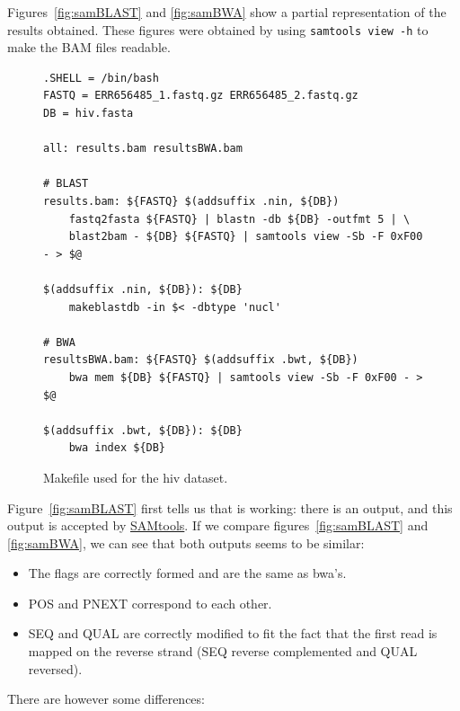 Figures~\ref{fig:samBLAST} and \ref{fig:samBWA} show a partial representation of the results obtained.
These figures were obtained by using \texttt{samtools view -h} to make the BAM files readable.

\begin{figure}
\begin{lstlisting}
.SHELL = /bin/bash
FASTQ = ERR656485_1.fastq.gz ERR656485_2.fastq.gz
DB = hiv.fasta

all: results.bam resultsBWA.bam

# BLAST
results.bam: ${FASTQ} $(addsuffix .nin, ${DB})
	fastq2fasta ${FASTQ} | blastn -db ${DB} -outfmt 5 | \
	blast2bam - ${DB} ${FASTQ} | samtools view -Sb -F 0xF00 - > $@

$(addsuffix .nin, ${DB}): ${DB}
	makeblastdb -in $< -dbtype 'nucl'

# BWA
resultsBWA.bam: ${FASTQ} $(addsuffix .bwt, ${DB})
	bwa mem ${DB} ${FASTQ} | samtools view -Sb -F 0xF00 - > $@

$(addsuffix .bwt, ${DB}): ${DB}
	bwa index ${DB}
\end{lstlisting}
\caption{Makefile used for the \acrshort{hiv} dataset.}
\label{fig:hivMake}
\end{figure}

Figure~\ref{fig:samBLAST} first tells us that \blastobam{} is working: there is an output, and this output is accepted by \href{http://www.htslib.org/}{SAMtools}.
If we compare figures~\ref{fig:samBLAST} and \ref{fig:samBWA}, we can see that both outputs seems to be similar:

\begin{itemize}
    \item The flags are correctly formed and are the same as \gls{bwa}'s.
    \item POS and PNEXT correspond to each other.
    \item SEQ and QUAL are correctly modified to fit the fact that the first read is mapped on the reverse strand (SEQ reverse complemented and QUAL reversed).
\end{itemize}

There are however some differences:

